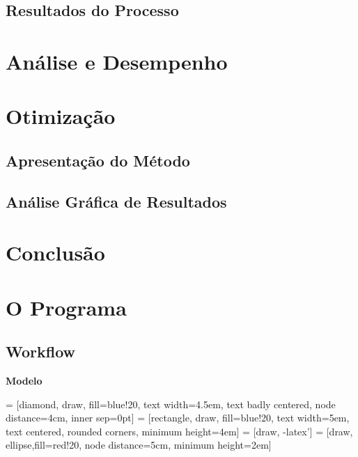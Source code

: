 \documentclass[a4paper,12pt]{report}
\begin{document}
\section{Resultados do Processo}

\chapter{Análise e Desempenho}





\chapter{Otimização}

\section{Apresentação do Método}

\section{Análise Gráfica de Resultados}

\chapter{Conclusão}



\appendix
\chapter{O Programa}

\section{Workflow}

\textbf{Modelo}

 = [diamond, draw, fill=blue!20, text width=4.5em, text badly centered, node distance=4cm, inner sep=0pt]
 = [rectangle, draw, fill=blue!20, text width=5em, text centered, rounded corners, minimum height=4em]
 = [draw, -latex']
 = [draw, ellipse,fill=red!20, node distance=5cm, minimum height=2em]
    
\end{document}
